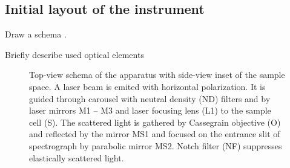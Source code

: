 \subsection{Initial layout of the instrument}

\begin{docitemize}
	\item Draw a schema .
	\item Briefly describe used optical elements
\end{docitemize}

\begin{figure}
	\centering
	
	\caption{Top-view schema of the apparatus with side-view inset of the sample
		space. A laser beam is emited with horizontal polarization. It is guided
		through carousel with neutral density (ND) filters and by laser mirrors
		M1 -- M3 and laser focusing lens (L1) to the sample cell (S). The scattered
		light is gathered by Cassegrain objective (O) and reflected by the mirror
		MS1 and focused on the entrance slit of spectrograph by parabolic mirror
		MS2. Notch filter (NF) suppresses elastically scattered light.}
	\label{\figlabel{initial_layout:aparatus_schema}}
\end{figure}

